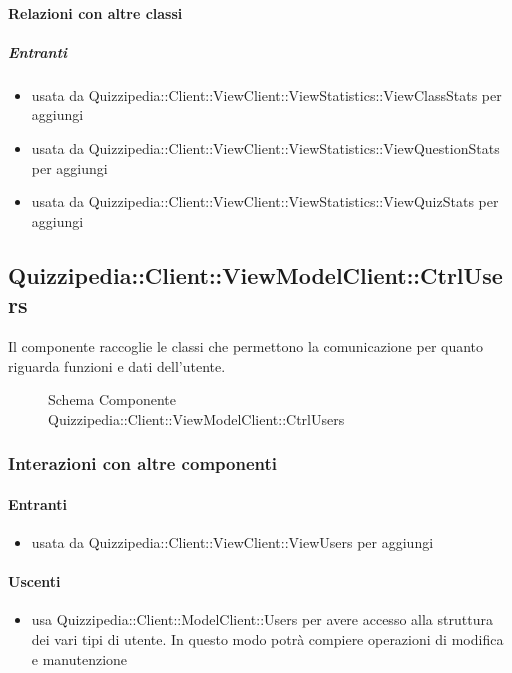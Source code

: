 \paragraph{Relazioni con altre classi}
\subparagraph{Entranti}
\begin{itemize}
\item usata da Quizzipedia::Client::ViewClient::ViewStatistics::ViewClassStats per aggiungi
\item usata da Quizzipedia::Client::ViewClient::ViewStatistics::ViewQuestionStats per aggiungi
\item usata da Quizzipedia::Client::ViewClient::ViewStatistics::ViewQuizStats per aggiungi
\end{itemize}
\subsection{Quizzipedia::Client::ViewModelClient::CtrlUsers}
Il componente raccoglie le classi che permettono la comunicazione per quanto riguarda funzioni e dati dell'utente.
\begin{figure}[H]
\centering
\noindent{}
\caption[Schema Componente Quizzipedia::Client::ViewModelClient::CtrlUsers]{Schema Componente Quizzipedia::Client::ViewModelClient::CtrlUsers}
\end{figure}
\subsubsection{Interazioni con altre componenti}
\paragraph{Entranti}
\begin{itemize}
\item usata da Quizzipedia::Client::ViewClient::ViewUsers per aggiungi
\end{itemize}
\paragraph{Uscenti}
\begin{itemize}
\item usa Quizzipedia::Client::ModelClient::Users per avere accesso alla struttura dei vari tipi di utente. In questo modo potrà compiere operazioni di modifica e manutenzione
\end{itemize}
